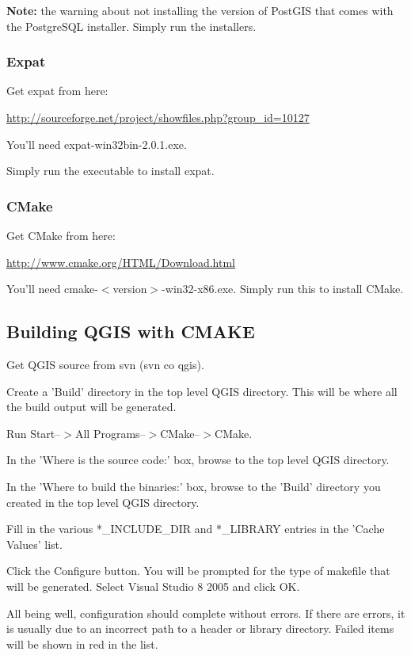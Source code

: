\textbf{Note:} the warning about not installing the version of PostGIS that comes with the PostgreSQL installer. Simply run the installers.

\subsubsection{Expat}
Get expat from here:

\url{http://sourceforge.net/project/showfiles.php?group\_id=10127}

You'll need expat-win32bin-2.0.1.exe.

Simply run the executable to install expat.

\subsubsection{CMake}
Get CMake from here:


\url{http://www.cmake.org/HTML/Download.html}

You'll need cmake-$<$version$>$-win32-x86.exe. Simply run this to install CMake.

\subsection{Building QGIS with CMAKE}
Get QGIS source from svn (svn co  qgis).

Create a 'Build' directory in the top level QGIS directory. This will be where all the build output will be generated.

Run Start--$>$All Programs--$>$CMake--$>$CMake. 

In the 'Where is the source code:' box, browse to the top level QGIS directory.

In the 'Where to build the binaries:' box, browse to the 'Build' directory you created in the top level QGIS directory.

Fill in the various *\_INCLUDE\_DIR and *\_LIBRARY entries in the 'Cache Values' list.

Click the Configure button. You will be prompted for the type of makefile that will be generated. Select Visual Studio 8 2005 and click OK.

All being well, configuration should complete without errors. If there are errors, it is usually due to an incorrect path to a header or library directory. Failed items will be shown in red in the list.

